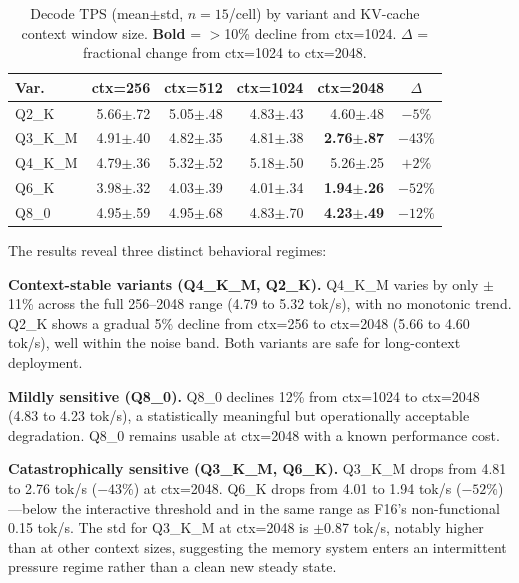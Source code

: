 \documentclass[conference]{IEEEtran}
\begin{document}
\begin{table}[h]
\centering
\caption{Decode TPS (mean$\pm$std, $n{=}15$/cell) by variant and KV-cache
context window size. \textbf{Bold} = $>$10\% decline from ctx=1024.
$\Delta$ = fractional change from ctx=1024 to ctx=2048.}
\label{tab:ctx2048}
\setlength{\tabcolsep}{3pt}
\footnotesize
\begin{tabular}{@{}lrrrrc@{}}
\toprule
\textbf{Var.} & \textbf{ctx=256} & \textbf{ctx=512} & \textbf{ctx=1024} & \textbf{ctx=2048} & \textbf{$\Delta$} \\
\midrule
Q2\_K    & 5.66{\tiny$\pm$.72} & 5.05{\tiny$\pm$.48} & 4.83{\tiny$\pm$.43} & 4.60{\tiny$\pm$.48} & $-5\%$ \\
Q3\_K\_M & 4.91{\tiny$\pm$.40} & 4.82{\tiny$\pm$.35} & 4.81{\tiny$\pm$.38} & \textbf{2.76{\tiny$\pm$.87}} & $-43\%$ \\
Q4\_K\_M & 4.79{\tiny$\pm$.36} & 5.32{\tiny$\pm$.52} & 5.18{\tiny$\pm$.50} & 5.26{\tiny$\pm$.25} & $+2\%$ \\
Q6\_K    & 3.98{\tiny$\pm$.32} & 4.03{\tiny$\pm$.39} & 4.01{\tiny$\pm$.34} & \textbf{1.94{\tiny$\pm$.26}} & $-52\%$ \\
Q8\_0    & 4.95{\tiny$\pm$.59} & 4.95{\tiny$\pm$.68} & 4.83{\tiny$\pm$.70} & \textbf{4.23{\tiny$\pm$.49}} & $-12\%$ \\
\bottomrule
\end{tabular}
\end{table}

The results reveal three distinct behavioral regimes:

\textbf{Context-stable variants (Q4\_K\_M, Q2\_K).} Q4\_K\_M varies by only
$\pm$11\% across the full 256--2048 range (4.79 to 5.32 tok/s), with no
monotonic trend. Q2\_K shows a gradual 5\% decline from ctx=256 to ctx=2048
(5.66 to 4.60 tok/s), well within the noise band. Both variants are safe for
long-context deployment.

\textbf{Mildly sensitive (Q8\_0).} Q8\_0 declines 12\% from ctx=1024 to
ctx=2048 (4.83 to 4.23 tok/s), a statistically meaningful but operationally
acceptable degradation. Q8\_0 remains usable at ctx=2048 with a known
performance cost.

\textbf{Catastrophically sensitive (Q3\_K\_M, Q6\_K).} Q3\_K\_M drops
from 4.81 to 2.76 tok/s ($-43\%$) at ctx=2048. Q6\_K drops from 4.01 to
1.94 tok/s ($-52\%$)---below the interactive threshold and in the same range
as F16's non-functional 0.15 tok/s. The std for Q3\_K\_M at ctx=2048
is $\pm$0.87 tok/s, notably higher than at other context sizes, suggesting
the memory system enters an intermittent pressure regime rather than a clean
new steady state.
\end{document}

